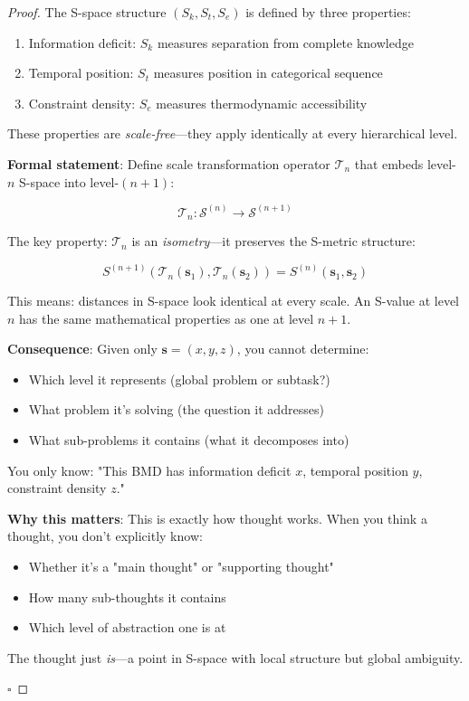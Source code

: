 \documentclass[12pt,a4paper]{article}
\begin{document}
\begin{proof}
The S-space structure $(S_k, S_t, S_e)$ is defined by three properties:
\begin{enumerate}
\item Information deficit: $S_k$ measures separation from complete knowledge
\item Temporal position: $S_t$ measures position in categorical sequence
\item Constraint density: $S_e$ measures thermodynamic accessibility
\end{enumerate}

These properties are \textit{scale-free}—they apply identically at every hierarchical level.

\textbf{Formal statement}: Define scale transformation operator $\mathcal{T}_n$ that embeds level-$n$ S-space into level-$(n+1)$:

\begin{equation}
\mathcal{T}_n: \mathcal{S}^{(n)} \to \mathcal{S}^{(n+1)}
\end{equation}

The key property: $\mathcal{T}_n$ is an \textit{isometry}—it preserves the S-metric structure:

\begin{equation}
S^{(n+1)}(\mathcal{T}_n(\mathbf{s}_1), \mathcal{T}_n(\mathbf{s}_2)) = S^{(n)}(\mathbf{s}_1, \mathbf{s}_2)
\end{equation}

This means: distances in S-space look identical at every scale. An S-value at level $n$ has the same mathematical properties as one at level $n+1$.

\textbf{Consequence}: Given only $\mathbf{s} = (x, y, z)$, you cannot determine:
\begin{itemize}
\item Which level it represents (global problem or subtask?)
\item What problem it's solving (the question it addresses)
\item What sub-problems it contains (what it decomposes into)
\end{itemize}

You only know: "This BMD has information deficit $x$, temporal position $y$, constraint density $z$."

\textbf{Why this matters}: This is exactly how thought works. When you think a thought, you don't explicitly know:
\begin{itemize}
\item Whether it's a "main thought" or "supporting thought"
\item How many sub-thoughts it contains
\item Which level of abstraction one is at
\end{itemize}

The thought just \textit{is}—a point in S-space with local structure but global ambiguity.

$\square$
\end{proof}
\end{document}
